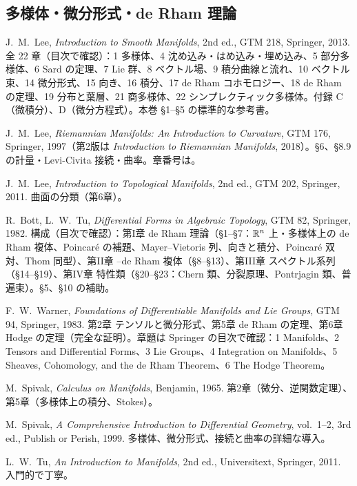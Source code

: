 \subsection*{多様体・微分形式・de Rham 理論}
\begin{description}[leftmargin=2.2em,labelindent=0pt,itemsep=3pt]
\item[{[Lee1]}] J.~M.~Lee, \emph{Introduction to Smooth Manifolds}, 2nd ed., GTM 218, Springer, 2013. 全 22 章（目次で確認）：1 多様体、4 沈め込み・はめ込み・埋め込み、5 部分多様体、6 Sard の定理、7 Lie 群、8 ベクトル場、9 積分曲線と流れ、10 ベクトル束、14 微分形式、15 向き、16 積分、17 de Rham コホモロジー、18 de Rham の定理、19 分布と葉層、21 商多様体、22 シンプレクティック多様体。付録 C（微積分）、D（微分方程式）。本巻 §1--§5 の標準的な参考書。
\item[{[Lee2]}] J.~M.~Lee, \emph{Riemannian Manifolds: An Introduction to Curvature}, GTM 176, Springer, 1997（第2版は \emph{Introduction to Riemannian Manifolds}, 2018）。§6、§8.9 の計量・Levi-Civita 接続・曲率。章番号は\tQ。
\item[{[Lee3]}] J.~M.~Lee, \emph{Introduction to Topological Manifolds}, 2nd ed., GTM 202, Springer, 2011. 曲面の分類（第6章）\tQ。
\item[{[BT]}] R.~Bott, L.~W.~Tu, \emph{Differential Forms in Algebraic Topology}, GTM 82, Springer, 1982. 構成（目次で確認）：第I章 de Rham 理論（§1--§7：$\mathbb R^n$ 上・多様体上の de Rham 複体、Poincaré の補題、Mayer--Vietoris 列、向きと積分、Poincaré 双対、Thom 同型）、第II章 {\Cech}--de Rham 複体（§8--§13）、第III章 スペクトル系列（§14--§19）、第IV章 特性類（§20--§23：Chern 類、分裂原理、Pontrjagin 類、普遍束）。§5、§10 の補助。
\item[{[Wa]}] F.~W.~Warner, \emph{Foundations of Differentiable Manifolds and Lie Groups}, GTM 94, Springer, 1983. 第2章 テンソルと微分形式、第5章 de Rham の定理、第6章 Hodge の定理（完全な証明）。章題は Springer の目次で確認：1 Manifolds、2 Tensors and Differential Forms、3 Lie Groups、4 Integration on Manifolds、5 Sheaves, Cohomology, and the de Rham Theorem、6 The Hodge Theorem。
\item[{[Sp1]}] M.~Spivak, \emph{Calculus on Manifolds}, Benjamin, 1965. 第2章（微分、逆関数定理）、第5章（多様体上の積分、Stokes）。
\item[{[Sp2]}] M.~Spivak, \emph{A Comprehensive Introduction to Differential Geometry}, vol.~1--2, 3rd ed., Publish or Perish, 1999. 多様体、微分形式、接続と曲率の詳細な導入。
\item[{[Tu1]}] L.~W.~Tu, \emph{An Introduction to Manifolds}, 2nd ed., Universitext, Springer, 2011. 入門的で丁寧。

\end{description}
